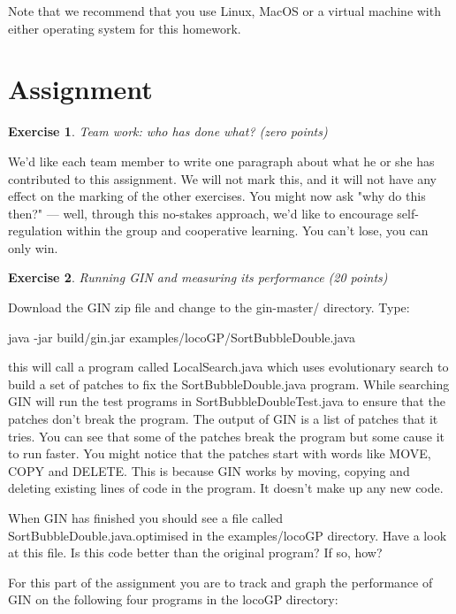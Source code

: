 \documentclass{pracs}
\newtheorem{exercise}{Exercise}
\begin{document}
\vspace{3mm}

Note that we recommend that you use Linux, MacOS or a virtual machine with either operating system for this homework.

\section{Assignment}

\begin{exercise}
Team work: who has done what? (zero points)
\end{exercise}

We'd like each team member to write one paragraph about what he or she has contributed to this assignment. We will not mark this, and it will not have any effect on the marking of the other exercises. You might now ask "why do this then?" --- well, through this no-stakes approach, we'd like to encourage self-regulation within the group and cooperative learning. You can't lose, you can only win.


\begin{exercise}
Running GIN and measuring its performance (20 points)
\end{exercise}

Download the GIN zip file and change to the gin-master/ directory. Type:

\hspace{10mm}java -jar build/gin.jar examples/locoGP/SortBubbleDouble.java

this will call a program called LocalSearch.java which uses evolutionary search to build a set of patches to fix the SortBubbleDouble.java program. While searching GIN will run the test programs in SortBubbleDoubleTest.java to ensure that the patches don’t break the program. The output of GIN is a list of patches that it tries. You can see that some of the patches break the program but some cause it to run faster. You might notice that the patches start with words like MOVE, COPY and DELETE. This is because GIN works by moving, copying and deleting existing lines of code in the program. It doesn’t make up any new code.

When GIN has finished you should see a file called SortBubbleDouble.java.optimised in the examples/locoGP directory. Have a look at this file. Is this code better than the original program? If so, how?

For this part of the assignment you are to track and graph the performance of GIN on the following four programs in the locoGP directory:
\end{document}
